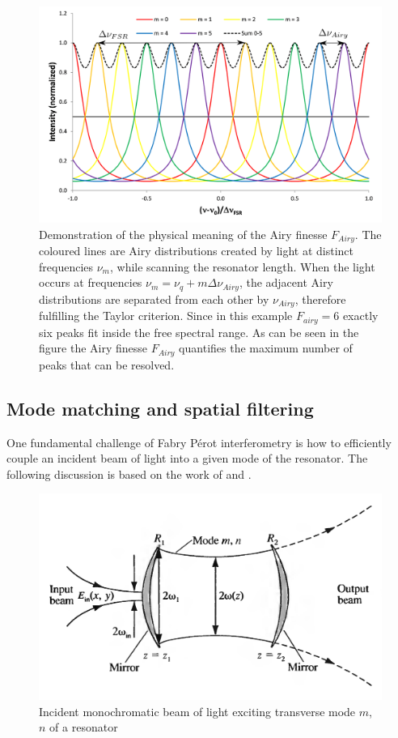 \begin{figure}[H]
	\centering
	\includegraphics[width=0.8\linewidth]{figures/fabry-perot/Airy_finesse_of_a_Fabry-Perot_interferometer}
	\caption[Demonstration of the physical meaning of the Airy finesse $F_{Airy}$]{Demonstration of the physical meaning of the Airy finesse $F_{Airy}$.
		The coloured lines are Airy distributions created by light at distinct frequencies $\nu_m$, while scanning the resonator length. When the light occurs at frequencies $\nu_m = \nu_q+m\Delta \nu_{Airy}$, the adjacent Airy distributions are separated from each other by $\nu_{Airy}$, therefore fulfilling the Taylor criterion.
		Since in this example $F_{airy}=6$  exactly six peaks fit inside the free spectral range.
		As can be seen in the figure the Airy finesse $F_{Airy}$ quantifies the maximum number of peaks that can be resolved. ~\cite{noauthor_fabryperot_nodate}}
	\label{fig:airyfinesseofafabry-perotinterferometer}
\end{figure}


\subsection{Mode matching and spatial filtering}

One fundamental challenge of Fabry Pérot interferometry is how to efficiently couple an incident beam of light into a given mode of the resonator.
The following discussion is based on the work of \textcite{yariv_photonics:_2007} and \textcite{meschede_optik_2008}.
\begin{figure}[H]
	\centering
	\includegraphics[width=0.7\linewidth]{figures/fabry-perot/excitation-of-transverse-mode}
	\caption{Incident monochromatic beam of light exciting transverse mode $m$, $n$ of a resonator~\cite{yariv_photonics:_2007}}
	\label{fig:excitation-of-transverse-mode}
\end{figure}

